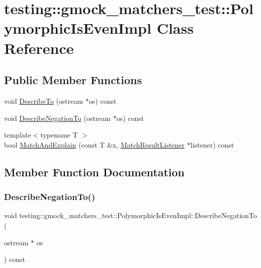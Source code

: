 \hypertarget{classtesting_1_1gmock__matchers__test_1_1_polymorphic_is_even_impl}{}\section{testing\+:\+:gmock\+\_\+matchers\+\_\+test\+:\+:Polymorphic\+Is\+Even\+Impl Class Reference}
\label{classtesting_1_1gmock__matchers__test_1_1_polymorphic_is_even_impl}
\subsection*{Public Member Functions}
\begin{DoxyCompactItemize}
\item 
void \hyperlink{classtesting_1_1gmock__matchers__test_1_1_polymorphic_is_even_impl_ac07eb9f72db98b4b5489a139e844394c}{Describe\+To} (ostream $\ast$os) const
\item 
void \hyperlink{classtesting_1_1gmock__matchers__test_1_1_polymorphic_is_even_impl_a2e873630451f3cf6cad5bf6f82e00a33}{Describe\+Negation\+To} (ostream $\ast$os) const
\item 
{\footnotesize template$<$typename T $>$ }\\bool \hyperlink{classtesting_1_1gmock__matchers__test_1_1_polymorphic_is_even_impl_ab8d500c4d6c57645527fc367acf6189e}{Match\+And\+Explain} (const T \&x, \hyperlink{classtesting_1_1_match_result_listener}{Match\+Result\+Listener} $\ast$listener) const
\end{DoxyCompactItemize}


\subsection{Member Function Documentation}
\mbox{\label{classtesting_1_1gmock__matchers__test_1_1_polymorphic_is_even_impl_a2e873630451f3cf6cad5bf6f82e00a33}} 
\subsubsection{\texorpdfstring{Describe\+Negation\+To()}{DescribeNegationTo()}}
{\footnotesize\ttfamily void testing\+::gmock\+\_\+matchers\+\_\+test\+::\+Polymorphic\+Is\+Even\+Impl\+::\+Describe\+Negation\+To (\begin{DoxyParamCaption}\item[{ostream $\ast$}]{os }\end{DoxyParamCaption}) const\hspace{0.3cm}{\ttfamily [inline]}}

